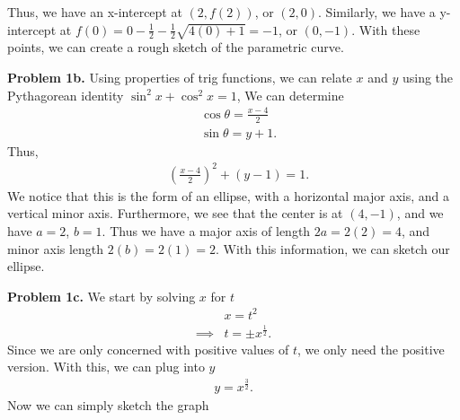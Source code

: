 \documentclass{report}
\begin{document}
    \bigbreak \noindent 
    \bigbreak \noindent 
    Thus, we have an x-intercept at $(2,f(2))$, or $(2,0)$. Similarly, we have a y-intercept at $f(0) = 0 - \frac{1}{2} - \frac{1}{2}\sqrt{4(0)+1} = -1$, or $(0,-1)$. With these points, we can create a rough sketch of the parametric curve.
    \begin{figure}[ht]
        \centering
        \label{fig:fig123}
    \end{figure}

    \pagebreak \bigbreak \noindent 
    \textbf{Problem 1b.} Using properties of trig functions, we can relate $x$ and $y$ using the Pythagorean identity $\sin^{2}{x} + \cos^{2}{x} = 1$, We can determine
    \begin{align*}
       &\cos{\theta} = \frac{x-4}{2} \\
       &\sin{\theta} = y+1
    .\end{align*}
    Thus, 
    \begin{align*}
        &\left(\frac{x-4}{2}\right)^{2} + (y-1) = 1
    .\end{align*}
    \bigbreak \noindent 
    We notice that this is the form of an ellipse, with a horizontal major axis, and a vertical minor axis. Furthermore, we see that the center is at $(4,-1)$, and we have $a=2$, $b=1$. Thus we have a major axis of length $2a = 2(2) = 4$, and minor axis length $2(b) = 2(1) = 2$. With this information, we can sketch our ellipse.
    \bigbreak \noindent
\begin{figure}[ht]
    \centering
    \label{fig:fig1234}
\end{figure}

    \pagebreak \bigbreak \noindent 
    \textbf{Problem 1c.} We start by solving $x$ for $t$
    \begin{align*}
        &x = t^{2} \\
        \implies &t = \pm x^{\frac{1}{2}}
    .\end{align*}
    Since we are only concerned with positive values of $t$, we only need the positive version. With this, we can plug into $y$ 
    \begin{align*}
        y = x^{\frac{3}{2}}
    .\end{align*}
    Now we can simply sketch the graph
\end{document}
